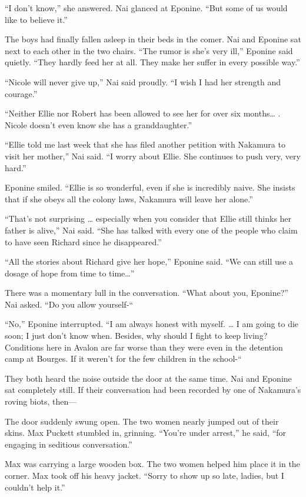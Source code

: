 \documentclass[]{article}
\begin{document}
{{“I don’t know,” she answered.  Nai glanced at Eponine.  “But some of us would like to believe it.”

The boys had finally fallen asleep in their beds in the comer.  Nai and Eponine sat next to each other in the two chairs.  “The rumor is she’s very ill,” Eponine said quietly.  “They hardly feed her at all.  They make her suffer in every possible way.”

“Nicole will never give up,” Nai said proudly.  “I wish I had her strength and courage.”

“Neither Ellie nor Robert has been allowed to see her for over six months… .  Nicole doesn’t even know she has a granddaughter.”

“Ellie told me last week that she has filed another petition with Nakamura to visit her mother,” Nai said.  “I worry about Ellie.  She continues to push very, very hard.”

Eponine smiled.  “Ellie is so wonderful, even if she is incredibly naive.  She insists that if she obeys all the colony laws, Nakamura will leave her alone.”

“That’s not surprising … especially when you consider that Ellie still thinks her father is alive,” Nai said.  “She has talked with every one of the people who claim to have seen Richard since he disappeared.”

“All the stories about Richard give her hope,” Eponine said.  “We can still use a dosage of hope from time to time…”

There was a momentary lull in the conversation.  “What about you, Eponine?” Nai asked.  “Do you allow yourself-“

“No,” Eponine interrupted.  “I am always honest with myself.  … I am going to die soon; I just don’t know when.  Besides, why should I fight to keep living? Conditions here in Avalon are far worse than they were even in the detention camp at Bourges.  If it weren’t for the few children in the school-“

They both heard the noise outside the door at the same time.  Nai and Eponine sat completely still.  If their conversation had been recorded by one of Nakamura’s roving biots, then—

The door suddenly swung open.  The two women nearly jumped out of their skins.  Max Puckett stumbled in, grinning.  “You’re under arrest,” he said, “for engaging in seditious conversation.”

Max was carrying a large wooden box.  The two women helped him place it in the corner.  Max took off his heavy jacket.  “Sorry to show up so late, ladies, but I couldn’t help it.”

}}
\end{document}
